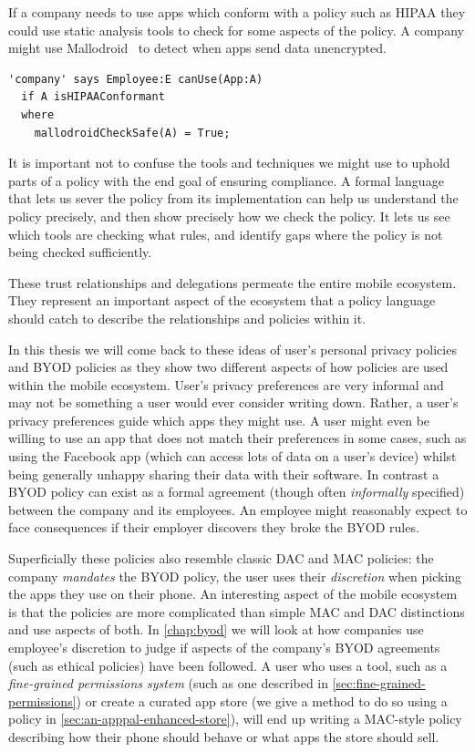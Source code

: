 \documentclass[thesis.tex]{subfiles}
\begin{document}
If a company needs to use apps which conform with a policy such as
\ac{HIPAA} they could use static analysis tools to check for some
aspects of the policy.  A company might use
Mallodroid~\cite{fahl_why_2012} to detect when apps send data unencrypted.  
%
\begin{lstlisting}
'company' says Employee:E canUse(App:A)
  if A isHIPAAConformant
  where
    mallodroidCheckSafe(A) = True;
\end{lstlisting}
%
It is important not to confuse the tools and
techniques we might use to uphold parts of a policy with the end
goal of ensuring compliance.  A formal language that
lets us sever the policy from its implementation can help us
understand the policy precisely, and then show precisely how we check the
policy.  It lets us see which tools are checking what rules, and identify gaps where the policy is not
being checked sufficiently.

These trust relationships and delegations permeate the entire mobile
ecosystem.  They represent an important aspect of the ecosystem that a
policy language should catch to describe the
relationships and policies within it.


In this thesis we will come back to these ideas of user's personal
privacy policies and BYOD policies as they show two different aspects
of how policies are used within the mobile ecosystem.
%
User's privacy preferences are very informal and may not be something
a user would ever consider writing down.  Rather, a user's privacy
preferences guide which apps they might use. A user might even be
willing to use an app that does not match their preferences in some
cases, such as using the Facebook app (which can access lots of data
on a user's device) whilst being generally unhappy sharing their data
with their software.
%
In contrast a BYOD policy can exist as a formal agreement (though
often \emph{informally} specified) between the company and its
employees.  An employee might reasonably expect to face consequences
if their employer discovers they broke the BYOD rules.

Superficially these policies also resemble classic DAC and MAC
policies: the company \emph{mandates} the BYOD policy, the user uses
their \emph{discretion} when picking the apps they use on their phone.
An interesting aspect of the mobile ecosystem is that the policies are
more complicated than simple MAC and DAC distinctions and use aspects
of both.  In \autoref{chap:byod} we will look at how companies use
employee's discretion to judge if aspects of the company's BYOD
agreements (such as ethical policies) have been followed.  A user who
uses a tool, such as a \emph{fine-grained permissions system} (such as
one described in \autoref{sec:fine-grained-permissions}) or create a
curated app store (we give a method to do so using a policy in
\autoref{sec:an-apppal-enhanced-store}), will end up writing a
MAC-style policy describing how their phone should behave or what apps
the store should sell.
\end{document}

